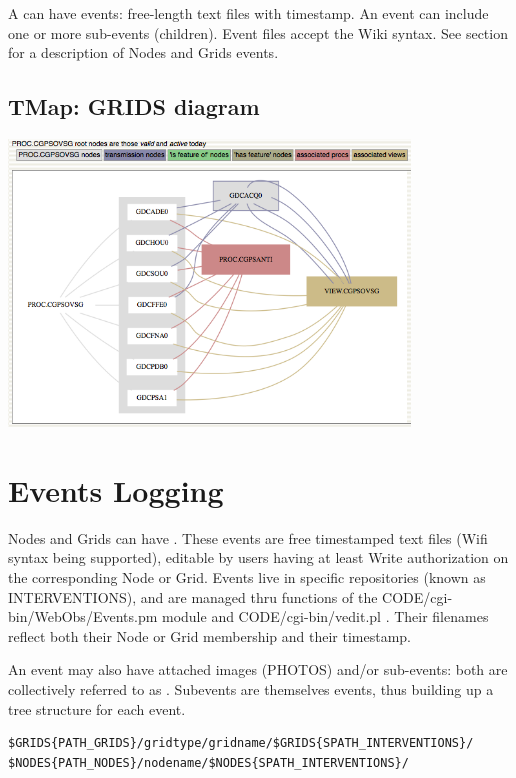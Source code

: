 A  can have events:  free-length text files with timestamp. An event can include one or more sub-events (children).
Event files  accept the Wiki syntax. See  section for a description of Nodes and Grids events.

\subsection{TMap: GRIDS diagram}
\label{tmap}

\includegraphics[width=0.8\textwidth]{figures/PROC_CGPSOVSG_tmap.png}


\section{Events Logging}
\label{events_logging}

Nodes and Grids can have . These events are free timestamped text files (Wifi syntax being supported), editable by users 
having at least Write authorization on the corresponding Node or Grid. Events live in specific repositories (known as INTERVENTIONS),
and are managed thru functions of 
the CODE/cgi-bin/WebObs/Events.pm module and CODE/cgi-bin/vedit.pl . Their filenames reflect both their Node or Grid membership and their timestamp. 

An event may also have attached images (PHOTOS) and/or sub-events: both are collectively referred to as . 
Subevents are themselves events, thus building up a tree structure for each event.

\begin{lstlisting}[title=Events base directories (interventions)]
$GRIDS{PATH_GRIDS}/gridtype/gridname/$GRIDS{SPATH_INTERVENTIONS}/
$NODES{PATH_NODES}/nodename/$NODES{SPATH_INTERVENTIONS}/
\end{lstlisting}


